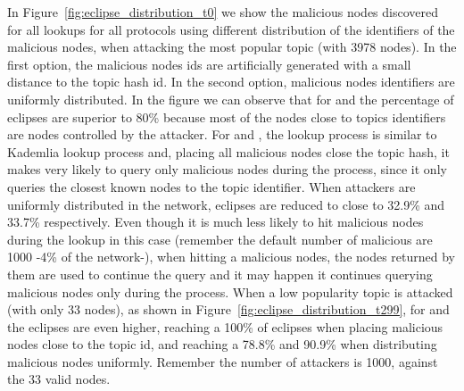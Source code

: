 
In Figure~\ref{fig:eclipse_distribution_t0} we show the malicious nodes discovered for all lookups for all protocols using different distribution of the identifiers of the malicious nodes,  when attacking the most popular topic (with 3978 nodes).  In the first option, the malicious nodes ids are artificially generated with a small distance to the topic hash id.  In the second option, malicious nodes identifiers are uniformly distributed.  In the figure we can observe that for \altname and \altnameticket the percentage of eclipses are superior to 80\% because most of the nodes close to topics identifiers are nodes controlled by the attacker.  
For \altname and \altnameticket, the lookup process is similar to Kademlia lookup process and,  placing all malicious nodes close the topic hash,  it makes very likely to query only malicious nodes during the process, since it only queries the closest known nodes to the topic identifier.
When attackers are uniformly distributed in the network, eclipses are reduced to close to 32.9\% and 33.7\% respectively.
Even though it is much less likely to hit malicious nodes during the lookup in this case (remember the default number of malicious are 1000 -4\% of the network-),  when hitting a malicious nodes, the nodes returned by them are used to continue the  query and it may happen it continues querying malicious nodes only during the process.
When a low popularity topic is attacked (with only 33 nodes),  as shown in Figure~\ref{fig:eclipse_distribution_t299},  for  \altname and \altnameticket the eclipses are even higher, reaching a 100\% of eclipses when placing malicious nodes close to the topic id, and reaching a 78.8\% and 90.9\% when distributing malicious nodes uniformly.  
Remember the number of attackers is 1000,  against the 33 valid nodes.

